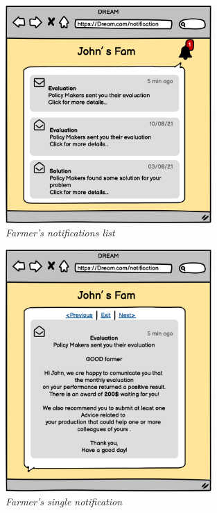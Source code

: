 \begin{figure}[H]
    \begin{center}
    \includegraphics[width=0.7\textwidth]{mockups/Notifications.png}
    \caption{\emph{Farmer's notifications list}}
    \label{fig:notificationList}
    \end{center}
\end{figure}

\begin{figure}[H]
    \begin{center}
    \includegraphics[width=0.7\textwidth]{mockups/Notification.png}
    \caption{\emph{Farmer's single notification}}
    \label{fig:singleNotification}
    \end{center}
\end{figure}

